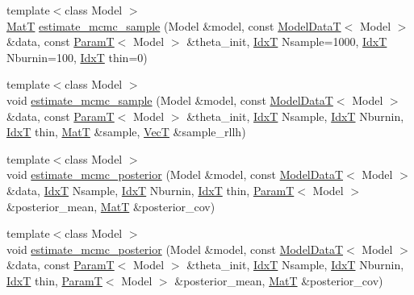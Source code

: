 \begin{DoxyCompactItemize}
\item 
{\footnotesize template$<$class Model $>$ }\\\hyperlink{namespacemappel_a7091ab87c528041f7e2027195fad8915}{MatT} \hyperlink{namespacemappel_1_1methods_abf7481af94ebff828622ec6b38a271ee}{estimate\+\_\+mcmc\+\_\+sample} (Model \&model, const \hyperlink{namespacemappel_a97f050df953605381ae9c901c3b125f1}{Model\+DataT}$<$ Model $>$ \&data, const \hyperlink{namespacemappel_a667925cb0d6c0e49f2f035cc5a9a6857}{ParamT}$<$ Model $>$ \&theta\+\_\+init, \hyperlink{namespacemappel_ab17ec0f30b61ece292439d7ece81d3a8}{IdxT} Nsample=1000, \hyperlink{namespacemappel_ab17ec0f30b61ece292439d7ece81d3a8}{IdxT} Nburnin=100, \hyperlink{namespacemappel_ab17ec0f30b61ece292439d7ece81d3a8}{IdxT} thin=0)
\item 
{\footnotesize template$<$class Model $>$ }\\void \hyperlink{namespacemappel_1_1methods_a5b0c8018510cec5dec285ea4cad912c5}{estimate\+\_\+mcmc\+\_\+sample} (Model \&model, const \hyperlink{namespacemappel_a97f050df953605381ae9c901c3b125f1}{Model\+DataT}$<$ Model $>$ \&data, const \hyperlink{namespacemappel_a667925cb0d6c0e49f2f035cc5a9a6857}{ParamT}$<$ Model $>$ \&theta\+\_\+init, \hyperlink{namespacemappel_ab17ec0f30b61ece292439d7ece81d3a8}{IdxT} Nsample, \hyperlink{namespacemappel_ab17ec0f30b61ece292439d7ece81d3a8}{IdxT} Nburnin, \hyperlink{namespacemappel_ab17ec0f30b61ece292439d7ece81d3a8}{IdxT} thin, \hyperlink{namespacemappel_a7091ab87c528041f7e2027195fad8915}{MatT} \&sample, \hyperlink{namespacemappel_a2225ad69f358daa3f4f99282a35b9a3a}{VecT} \&sample\+\_\+rllh)
\item 
{\footnotesize template$<$class Model $>$ }\\void \hyperlink{namespacemappel_1_1methods_a224995eff4bf3ee7652f2ed9116d8cf7}{estimate\+\_\+mcmc\+\_\+posterior} (Model \&model, const \hyperlink{namespacemappel_a97f050df953605381ae9c901c3b125f1}{Model\+DataT}$<$ Model $>$ \&data, \hyperlink{namespacemappel_ab17ec0f30b61ece292439d7ece81d3a8}{IdxT} Nsample, \hyperlink{namespacemappel_ab17ec0f30b61ece292439d7ece81d3a8}{IdxT} Nburnin, \hyperlink{namespacemappel_ab17ec0f30b61ece292439d7ece81d3a8}{IdxT} thin, \hyperlink{namespacemappel_a667925cb0d6c0e49f2f035cc5a9a6857}{ParamT}$<$ Model $>$ \&posterior\+\_\+mean, \hyperlink{namespacemappel_a7091ab87c528041f7e2027195fad8915}{MatT} \&posterior\+\_\+cov)
\item 
{\footnotesize template$<$class Model $>$ }\\void \hyperlink{namespacemappel_1_1methods_ab616d99318131c7f70f49581d9c9d77a}{estimate\+\_\+mcmc\+\_\+posterior} (Model \&model, const \hyperlink{namespacemappel_a97f050df953605381ae9c901c3b125f1}{Model\+DataT}$<$ Model $>$ \&data, const \hyperlink{namespacemappel_a667925cb0d6c0e49f2f035cc5a9a6857}{ParamT}$<$ Model $>$ \&theta\+\_\+init, \hyperlink{namespacemappel_ab17ec0f30b61ece292439d7ece81d3a8}{IdxT} Nsample, \hyperlink{namespacemappel_ab17ec0f30b61ece292439d7ece81d3a8}{IdxT} Nburnin, \hyperlink{namespacemappel_ab17ec0f30b61ece292439d7ece81d3a8}{IdxT} thin, \hyperlink{namespacemappel_a667925cb0d6c0e49f2f035cc5a9a6857}{ParamT}$<$ Model $>$ \&posterior\+\_\+mean, \hyperlink{namespacemappel_a7091ab87c528041f7e2027195fad8915}{MatT} \&posterior\+\_\+cov)

\end{DoxyCompactItemize}
